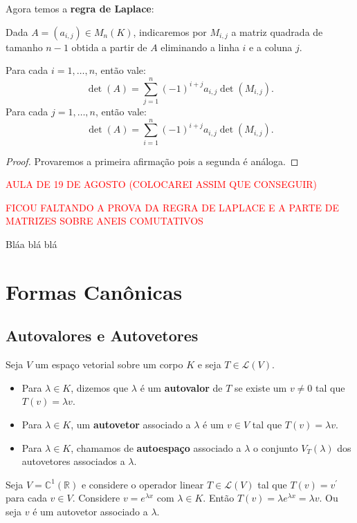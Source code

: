 \documentclass[11pt,twoside,a4paper]{book}
\begin{document}
\noindent
Agora temos a \textbf{regra de Laplace}:

\begin{teorema}
Dada $A=(a_{i,j})\in M_n(K)$, indicaremos por $M_{i,j}$ a matriz quadrada de tamanho $n-1$ obtida a partir de $A$ eliminando a linha $i$ e a coluna $j$.

\smallskip
\noindent
Para cada $i=1,\dots,n$, então vale:
\[
\det(A)=\sum_{j=1}^n(-1)^{i+j}a_{i,j}\det(M_{i,j}).
\]
Para cada $j=1,\dots,n$, então vale:
\[
\det(A)=\sum_{i=1}^n(-1)^{i+j}a_{i,j}\det(M_{i,j}).
\]
\end{teorema}
\begin{proof}
Provaremos a primeira afirmação pois a segunda é análoga.
\end{proof}

\medskip
\noindent
\textcolor{red}{AULA DE 19 DE AGOSTO (COLOCAREI ASSIM QUE CONSEGUIR)}

\medskip
\noindent
\textcolor{red}{FICOU FALTANDO A PROVA DA REGRA DE LAPLACE E A PARTE DE MATRIZES SOBRE ANEIS COMUTATIVOS}

\medskip
\noindent
Bláa blá blá

\chapter{Formas Canônicas}

\section{Autovalores e Autovetores}

\begin{definicao}
Seja \(V\) um espaço vetorial sobre um corpo \(K\) e seja \(T\in\mathcal{L}(V)\).
\begin{itemize}
\item Para $\lambda\in K$, dizemos que $\lambda$ é um \textbf{autovalor} de $T$ se existe um $v\neq 0$ tal que $T(v)=\lambda v$.
\item Para $\lambda\in K$, um \textbf{autovetor} associado a $\lambda$ é um $v\in V$ tal que $T(v)=\lambda v$.
\item Para $\lambda\in K$, chamamos de \textbf{autoespaço} associado a $\lambda$ o conjunto $V_T(\lambda)$ dos autovetores associados a $\lambda$.
\end{itemize}
\end{definicao}

\begin{exemplo}
Seja \(V=\mathbb{C}^1(\mathbb{R})\) e considere o operador linear \(T\in\mathcal{L}(V)\) tal que \(T(v)=v^\prime\) para cada \(v\in V\). Considere \(v=e^{\lambda x}\) com \(\lambda\in K\). Então \(T(v)=\lambda e^{\lambda x}=\lambda v\). Ou seja \(v\) é um autovetor associado a \(\lambda\).
\end{exemplo}
\end{document}
